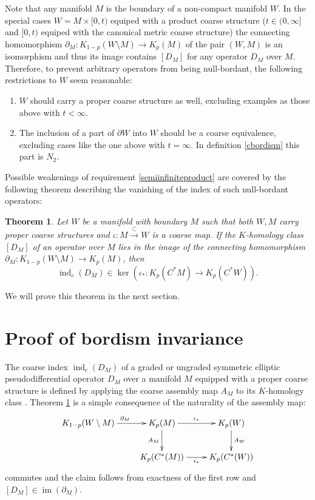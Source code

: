 \documentclass[a4paper]{amsproc}
\newtheorem{theorem}{Theorem}[section]
\theoremstyle{definition}
\theoremstyle{remark}
\numberwithin{equation}{section}
\begin{document}
Note that any manifold $M$ is the boundary of a non-compact manifold $W$. In the special cases $W=M\times [0,t)$ equiped with a product coarse structure ($t\in(0,\infty]$ and $[0,t)$ equiped with the canonical metric coarse structure) the connecting homomorphism
$\partial_M:K_{1-p}(W\setminus M)\to K_p(M)$ of the pair $(W,M)$ is an isomorphism and thus its image contains $[D_M]$ for any operator $D_M$ over $M$.
Therefore, to prevent arbitrary operators from being null-bordant, the following restrictions to $W$ seem reasonable:
\begin{enumerate}
\item $W$ should carry a proper coarse structure as well, excluding examples as those above with $t<\infty$.
\item The inclusion of a part of $\partial W$ into $W$ should be a coarse equivalence, excluding cases like the one above with $t=\infty$. In definition \ref{cbordism} this part is $N_2$. \label{semiinfiniteproduct} \end{enumerate}

Possible weakenings of requirement \ref{semiinfiniteproduct} are covered by the following theorem describing the vanishing of the index of such null-bordant operators:

\begin{theorem}\label{vanishing}
Let $W$ be a manifold with boundary $M$ such that both $W,M$ carry proper coarse structures and $\iota:M\xrightarrow{\subset} W$ is a coarse map. If the $K$-homology class $[D_M]$ of an operator over $M$ lies in the image of the connecting homomorphism $\partial_M:K_{1-p}(W\setminus M)\to K_p(M)$, then
$$\operatorname{ind}_c(D_M)\in\ker(\iota_*:K_p(C^*M)\to K_p(C^*W)).$$
\end{theorem}
We will prove this theorem in the next section.

\section{Proof of bordism invariance}\label{invariance}
The coarse index $\operatorname{ind}_c(D_M)$ of a graded or ungraded symmetric elliptic pseudodifferential operator $D_M$ over a manifold $M$ equipped with a proper coarse structure is defined by applying the coarse assembly map $A_M$ to its $K$-homology class \cite[Chapter 12]{MR1817560}. Theorem \ref{vanishing} is a simple consequence of the naturality of the assembly map:
\begin{equation*}\xymatrix{
K_{1-p}(W\setminus M)\ar[r]^{\partial_M}
&K_p(M)\ar[r]^{\iota_*}\ar[d]_{A_M}
&K_p(W)\ar[d]^{A_W}
\\&K_p(C^*(M))\ar[r]_{\iota_*}
&K_p(C^*(W))
}\end{equation*}
commutes and the claim follows from exactness of the first row and $[D_M]\in\operatorname{im}(\partial_M)$.
\end{document}
